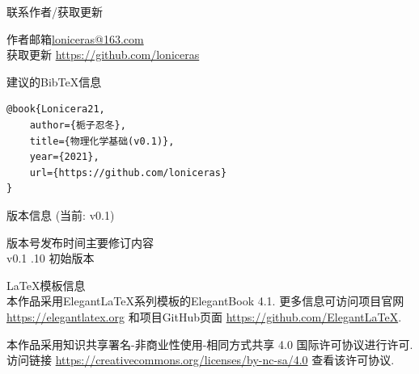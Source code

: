 \thispagestyle{empty}

\noindent 联系作者/获取更新
\begin{tabbing}
	作者邮箱\qquad \= \url{loniceras@163.com} \\
	获取更新 \> \url{https://github.com/loniceras}
\end{tabbing}

\vspace*{\baselineskip}
\noindent 建议的BibTeX信息
\begin{verbatim}
@book{Lonicera21,
    author={栀子忍冬},
    title={物理化学基础(v0.1)},
    year={2021},
    url={https://github.com/loniceras}
}
\end{verbatim}

\vspace*{\baselineskip}
\noindent 版本信息 (当前: v0.1)
\begin{tabbing}
	版本号\qquad \= 发布时间\qquad \= 主要修订内容 \\
	v0.1 .10 \> 初始版本 \\
\end{tabbing}

\vspace*{\baselineskip}
\noindent LaTeX模板信息
\vspace*{\topsep}\\
\noindent 本作品采用ElegantLaTeX系列模板的ElegantBook 4.1. 更多信息可访问项目官网 \url{https://elegantlatex.org} 和项目GitHub页面 \url{https://github.com/ElegantLaTeX}.

\vspace*{8cm}
\begin{window}
	\noindent 本作品采用知识共享署名-非商业性使用-相同方式共享 4.0 国际许可协议进行许可. 访问链接 \url{https://creativecommons.org/licenses/by-nc-sa/4.0} 查看该许可协议.
\end{window}